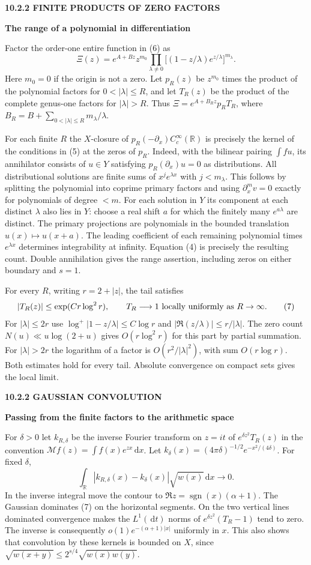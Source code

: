 \documentclass[11pt,letterpaper]{article}
\newcommand{\rightmarktext}{}
\newcommand{\printfolio}{}
\newcommand{\leaf}[4]{\clearpage\gdef\printfolio{#1}\gdef\rightmarktext{#2}%
  {\small\sffamily\bfseries\color{ink}#3\par}\vspace{3pt}%
  {\LARGE\bfseries #4\par}\vspace{5pt}}
\newcommand{\R}{\mathbb R}
\newcommand{\dd}{\,\mathrm d}
\begin{document}
\leaf{446a}{The arithmetic quotient}{10.2.2 \quad FINITE PRODUCTS OF ZERO FACTORS}{The range of a polynomial in differentiation}
Factor the order-one entire function in (6) as
\[
 \Xi(z)=e^{A+Bz}z^{m_0}\prod_{\lambda\ne0}
       \big[(1-z/\lambda)e^{z/\lambda}\big]^{m_\lambda}.
\]
Here $m_0=0$ if the origin is not a zero. Let $p_R(z)$ be $z^{m_0}$
times the product of the polynomial factors for $0<|\lambda|\le R$,
and let $T_R(z)$ be the product of the complete genus-one factors for
$|\lambda|>R$. Thus $\Xi=e^{A+B_Rz}p_R T_R$, where
$B_R=B+\sum_{0<|\lambda|\le R}m_\lambda/\lambda$.

For each finite $R$ the $X$-closure of
$p_R(-\partial_x)C_c^\infty(\R)$ is precisely the kernel of the
conditions in (5) at the zeros of $p_R$. Indeed, with the bilinear
pairing $\int f u$, its annihilator consists of $u\in Y$ satisfying
$p_R(\partial_x)u=0$ as distributions. All distributional solutions
are finite sums of $x^je^{\lambda x}$ with $j<m_\lambda$.
This follows by splitting the polynomial into coprime primary factors
and using $\partial_x^m v=0$ exactly for polynomials of degree $<m$.
For each solution in $Y$ its component at each distinct $\lambda$ also
lies in $Y$: choose a real shift $a$ for which the finitely many
$e^{a\lambda}$ are distinct. The primary projections are polynomials in
the bounded translation $u(x)\mapsto u(x+a)$. The leading coefficient
of each remaining polynomial times $e^{\lambda x}$ determines
integrability at infinity. Equation (4) is precisely the resulting
count. Double annihilation gives the range assertion, including zeros
on either boundary and $s=1$.

For every $R$, writing $r=2+|z|$, the tail satisfies
\[
          |T_R(z)|\le \exp(Cr\log^2 r),\qquad T_R\longrightarrow1
          \ \hbox{locally uniformly as }R\to\infty .
 \tag{7}
\]
For $|\lambda|\le 2r$ use $\log^+|1-z/\lambda|\le C\log r$
and $|\Re(z/\lambda)|\le r/|\lambda|$. The zero count
$N(u)\ll u\log(2+u)$ gives $O(r\log^2 r)$ for this part by partial
summation. For $|\lambda|>2r$ the logarithm of a factor is
$O(r^2/|\lambda|^2)$, with sum $O(r\log r)$. Both estimates hold for
every tail. Absolute convergence on compact sets gives the local limit.

\leaf{446b}{The arithmetic quotient}{10.2.2 \quad GAUSSIAN CONVOLUTION}{Passing from the finite factors to the arithmetic space}
For $\delta>0$ let $k_{R,\delta}$ be the inverse Fourier transform on
$z=it$ of $e^{\delta z^2}T_R(z)$ in the convention
$\mathcal M f(z)=\int f(x)e^{zx}\dd x$. Let $k_\delta(x)
=(4\pi\delta)^{-1/2}e^{-x^2/(4\delta)}$. For fixed $\delta$,
\[
          \int_\R |k_{R,\delta}(x)-k_\delta(x)|\sqrt{w(x)}\dd x
                   \longrightarrow0 .
 \tag{8}
\]
In the inverse integral move the contour to
$\Re z=\operatorname{sgn}(x)(\alpha+1)$. The Gaussian dominates (7)
on the horizontal segments. On the two vertical lines dominated convergence
makes the $L^1(\dd t)$ norms of $e^{\delta z^2}(T_R-1)$ tend to zero.
The inverse is consequently $o(1)e^{-(\alpha+1)|x|}$ uniformly in $x$.
This also shows that convolution by these kernels is bounded on $X$,
since $\sqrt{w(x+y)}\le 2^{s/4}\sqrt{w(x)w(y)}$.
\end{document}
